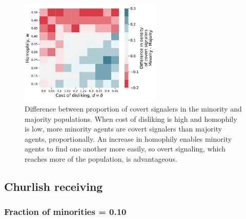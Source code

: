 \documentclass[11pt,letterpaper]{article}
\begin{document}
\begin{figure}[H]
  \centering
    \includegraphics[width=0.6\textwidth]{prelim/Figures/covert_signalers_diff_005.pdf}
  \caption{Difference between proportion of covert signalers in the minority 
    and majority populations. When cost of disliking is high and homophily is 
    low, more minority agents are covert signalers than majority agents,
    proportionally. An increase in homophily enables minority agents to 
    find one another more easily, so overt signaling, which reaches more of
    the population, is advantageous.
  }
  \label{fig:}
\end{figure}


\subsection{Churlish receiving}

\subsubsection{Fraction of minorities = 0.10}
\end{document}

